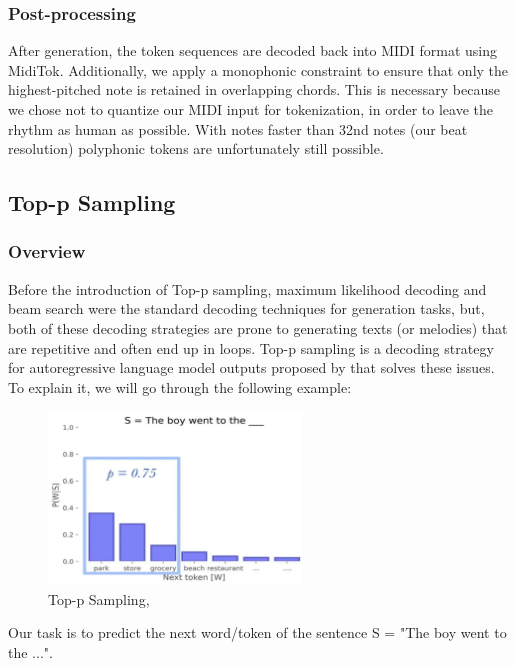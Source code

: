 \documentclass[a4paper,12pt]{extarticle}
\begin{document}
\subsubsection{Post-processing}
After generation, the token sequences are decoded back into MIDI format using MidiTok. Additionally, we apply a monophonic constraint to ensure that only the highest-pitched note is retained in overlapping chords.
This is necessary because we chose not to quantize our MIDI input for tokenization, in order to leave the rhythm as human as possible. With notes faster than 32nd notes (our beat resolution) polyphonic tokens are unfortunately still possible.

\subsection{Top-p Sampling}
\label{sec:6_9}
\subsubsection{Overview}

Before the introduction of Top-p sampling, maximum likelihood decoding and beam search were the standard decoding techniques for generation tasks, but, both of these decoding strategies are prone to generating texts (or melodies) that are repetitive and often end up in loops. Top-p sampling is a decoding strategy for autoregressive language model outputs proposed by \textcite{holtzman2020curiouscaseneuraltext} that solves these issues. To explain it, we will go through the following example:

\begin{figure}[H] %
    \centering
    \includegraphics[width=0.6\textwidth]{top p.png} %
    \caption{Top-p Sampling, \textcite{TopPWebsite}}
    \label{fig:topp}
\end{figure}

Our task is to predict the next word/token of the sentence S = "The boy went to the ...".
\end{document}
